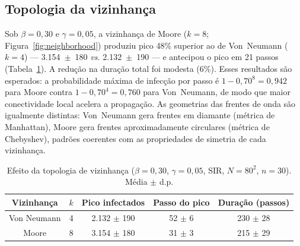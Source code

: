 \documentclass[fleqn,10pt]{wlscirep}
\begin{document}
\subsection*{Topologia da vizinhan\c{c}a}

Sob $\beta = 0{,}30$ e $\gamma = 0{,}05$, a vizinhan\c{c}a de Moore ($k = 8$; Figura~\ref{fig:neighborhood}) produziu pico 48\% superior ao de Von~Neumann ($k = 4$) --- 3.154~$\pm$~180 \emph{vs.} 2.132~$\pm$~190 --- e antecipou o pico em 21 passos (Tabela~\ref{tab:neighborhood}). A redu\c{c}\~{a}o na dura\c{c}\~{a}o total foi modesta (6\%). Esses resultados s\~{a}o esperados: a probabilidade m\'{a}xima de infec\c{c}\~{a}o por passo \'{e} $1-0{,}70^8 = 0{,}942$ para Moore contra $1-0{,}70^4 = 0{,}760$ para Von~Neumann, de modo que maior conectividade local acelera a propaga\c{c}\~{a}o\cite{Fuentes:1999}. As geometrias das frentes de onda s\~{a}o igualmente distintas: Von~Neumann gera frentes em diamante (m\'{e}trica de Manhattan), Moore gera frentes aproximadamente circulares (m\'{e}trica de Chebyshev), padr\~{o}es coerentes com as propriedades de simetria de cada vizinhan\c{c}a.

\begin{table}[ht]
\centering
\caption{\label{tab:neighborhood}Efeito da topologia de vizinhan\c{c}a ($\beta = 0{,}30$, $\gamma = 0{,}05$, SIR, $N = 80^2$, $n = 30$). M\'{e}dia $\pm$ d.p.}
\begin{tabular}{ccccc}
\toprule
Vizinhan\c{c}a & $k$ & Pico infectados & Passo do pico & Dura\c{c}\~{a}o (passos) \\
\midrule
Von Neumann & 4 & 2.132 $\pm$ 190 & 52 $\pm$ 6 & 230 $\pm$ 28 \\
Moore       & 8 & 3.154 $\pm$ 180 & 31 $\pm$ 3 & 215 $\pm$ 29 \\
\bottomrule
\end{tabular}
\end{table}
\end{document}
